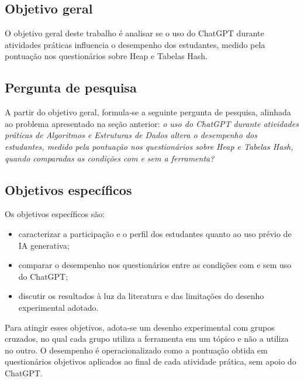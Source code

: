 \subsection{Objetivo geral}

O objetivo geral deste trabalho é analisar se o uso do ChatGPT durante atividades práticas influencia o desempenho dos estudantes, medido pela pontuação nos questionários sobre Heap e Tabelas Hash.

\subsection{Pergunta de pesquisa}

A partir do objetivo geral, formula-se a seguinte pergunta de pesquisa, alinhada ao problema apresentado na seção anterior: \textit{o uso do ChatGPT durante atividades práticas de Algoritmos e Estruturas de Dados altera o desempenho dos estudantes, medido pela pontuação nos questionários sobre Heap e Tabelas Hash, quando comparadas as condições com e sem a ferramenta?}

\subsection{Objetivos específicos}

Os objetivos específicos são:

\begin{itemize}
    \item caracterizar a participação e o perfil dos estudantes quanto ao uso prévio de IA generativa;
    \item comparar o desempenho nos questionários entre as condições com e sem uso do ChatGPT;
    \item discutir os resultados à luz da literatura e das limitações do desenho experimental adotado.
\end{itemize}

Para atingir esses objetivos, adota-se um desenho experimental com grupos cruzados, no qual cada grupo utiliza a ferramenta em um tópico e não a utiliza no outro. O desempenho é operacionalizado como a pontuação obtida em questionários objetivos aplicados ao final de cada atividade prática, sem apoio do ChatGPT.

